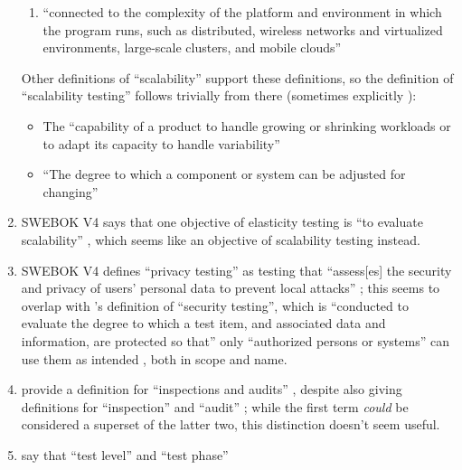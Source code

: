 \begin{enumerate}
\begin{enumerate}
                  \item ``connected to the complexity of the platform and
                        environment in which the program runs, such as
                        distributed, wireless networks and virtualized
                        environments, large-scale clusters, and mobile clouds''
                        \citep[p.~5-5]{SWEBOK2024}
            \end{enumerate}
            Other definitions of ``scalability'' support these definitions, so
            the definition of ``scalability testing'' follows trivially from there
            (sometimes explicitly ):
            \begin{itemize}
                  \item The ``capability of a product to handle growing or
                        shrinking workloads or to adapt its capacity to handle
                        variability'' \citep{ISO_IEC2023a}
                  \item ``The degree to which a component or system can be
                        adjusted for changing'' 
            \end{itemize}
      \item SWEBOK V4 says that one objective of elasticity testing is ``to
            evaluate scalability'' \citep[p.~5-9]{SWEBOK2024}, which seems like
            an objective of scalability testing instead.
      \item SWEBOK V4 defines ``privacy testing'' as testing that ``assess[es]
            the security and privacy of users' personal data to prevent local
            attacks'' \citep[p.~5-10]{SWEBOK2024}; this seems to overlap with
            \citeauthor{IEEE2022}'s definition of ``security testing'', which is
            ``conducted to evaluate the degree to which a test item, and
            associated data and information, are protected so that'' only
            ``authorized persons or systems'' can use them as intended
            \citeyearpar{IEEE2022}, both in scope and name.
      \item \citeauthor*{IEEE2017} provide a definition for ``inspections and
            audits'' \citeyearpar[p.~228]{IEEE2017}, despite also giving
            definitions for ``inspection'' \citeyearpar[p.~227]{IEEE2017} and
            ``audit'' \citeyearpar[p.~36]{IEEE2017}; while the first term
            \emph{could} be considered a superset of the latter two, this
            distinction doesn't seem useful.
      \item \citeauthor*{IEEE2017} say that ``test level'' and ``test phase''

\end{enumerate}
